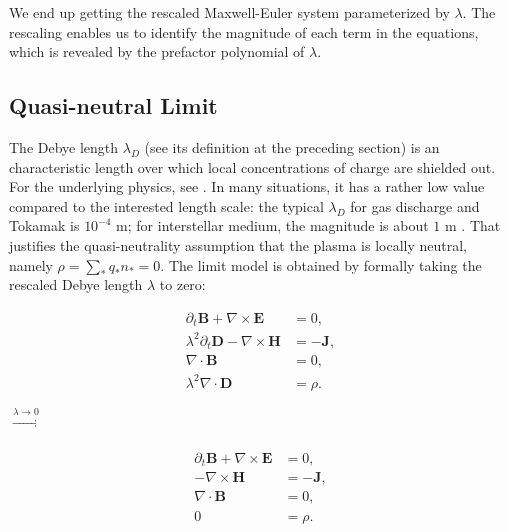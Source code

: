 \documentclass{article}
\begin{document}
We end up getting the rescaled Maxwell-Euler system parameterized by $\lambda$. The rescaling enables us to identify the magnitude of each term in the equations, which is revealed by the prefactor polynomial of $\lambda$.  

\subsection{Quasi-neutral Limit} \label{sec:quasi-neutral_limit}
The Debye length $\lambda_D$ (see its definition at the preceding section) is an characteristic length over which local concentrations of charge are shielded out. For the underlying physics, see \cite[Sec. 1.4]{chen2016}. In many situations, it has a rather low value compared to the interested length scale: the typical $\lambda_D$ for gas discharge and Tokamak is $10^{-4}$ m; for interstellar medium, the magnitude is about $1$ m \cite[ch. 20]{Blandford_2013}. That justifies the quasi-neutrality assumption that the plasma is locally neutral, namely $\rho = \sum_* q_*n_* = 0$. The limit model is obtained by formally taking the rescaled Debye length $\lambda$ to zero:
\vspace{-\baselineskip}
\begin{center}
    \begin{minipage}{0.3\textwidth}
\begin{subequations}
\begin{align*}
    \partial_t \mathbf{B} + \nabla \times \mathbf{E} &= 0,\\ 
    \lambda^2 \partial_t \mathbf{D} - \nabla \times \mathbf{H} &= - \mathbf{J}, \\
    \nabla \cdot \mathbf{B} &= 0, \\
    \lambda^2 \nabla \cdot \mathbf{D} &= \rho.
\end{align*}
\end{subequations}

\end{minipage}
$\xrightarrow[]{\lambda \rightarrow 0}$
\begin{minipage}{0.3\textwidth}
\begin{subequations}
\begin{align}
    \partial_t \mathbf{B} + \nabla \times \mathbf{E} &= 0, \label{equ:maxwell_faraday_limit} \\ 
    - \nabla \times \mathbf{H} &= - \mathbf{J}, \label{equ:maxwell_ampere_limit} \\
    \nabla \cdot \mathbf{B} &= 0,  \label{equ:maxwell_gauss_B_limit}\\
     0 &= \rho. \label{equ:maxwell_gauss_D_limit}
\end{align}
\end{subequations}
\end{minipage}
\end{center}
\end{document}
